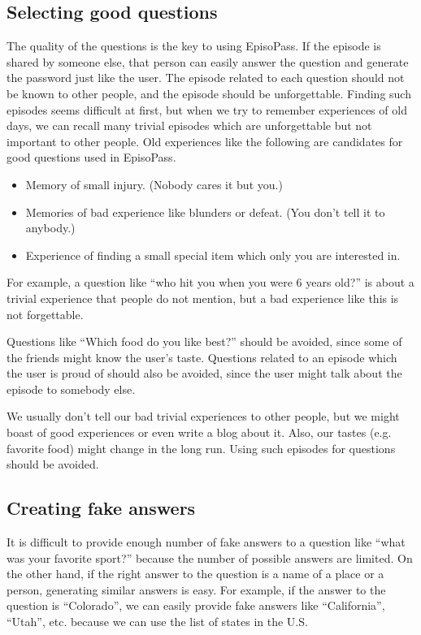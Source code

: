 \documentclass[runningheads,a4paper]{llncs}
\begin{document}
\subsection{Selecting good questions}

The quality of the questions is the key to using EpisoPass.
If the episode is shared by someone else,
that person can easily answer the question and generate the
password just like the user.
%
The episode related to each question should not be known to other people,
and the episode should be unforgettable.
%
Finding such episodes seems difficult at first, but
when we try to remember experiences of old days,
we can recall many trivial episodes which are unforgettable but
not important to other people.
%
Old experiences like the following are candidates for
good questions used in EpisoPass.

\begin{itemize}
\item Memory of small injury. (Nobody cares it but you.)

\item Memories of bad experience like blunders or defeat.
(You don't tell it to anybody.)

\item Experience of finding a small special item which only you are interested in.
\end{itemize}

For example, a question like
``who hit you when you were 6 years old?''
is about a trivial experience that people do not mention,
but a bad experience like this is not forgettable.

Questions like ``Which food do you like best?'' should be avoided,
since some of the friends might know the user's taste.
Questions related to an episode which the user is proud of should also be
avoided, since the user might talk about the episode to somebody else.

We usually don't tell our bad trivial experiences to other people,
but we might boast of good experiences or even write a blog about it.
Also, our tastes (e.g. favorite food) might change in the long run.
Using such episodes for questions should be avoided.

\subsection{Creating fake answers}

It is difficult to provide enough number of fake answers to a question like
``what was your favorite sport?''
because the number of possible answers are limited.
%
On the other hand, if the right answer to the question is a name of a place or a person,
generating similar answers is easy.
For example, if the answer to the question is ``Colorado'',
we can easily provide fake answers like ``California'', ``Utah'', etc.
because we can use the list of states in the U.S.
\end{document}
